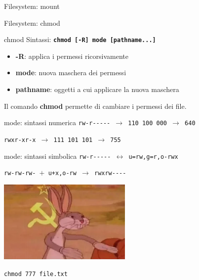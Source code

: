 \documentclass{beamer}
\begin{document}
    \begin{frame}{Filesystem: mount}
    \end{frame}

    \begin{frame}{Filesystem: chmod}
        \begin{block}{chmod}
            \small
            Sintassi: \texttt{\textbf{chmod [-R] mode [pathname...]}}

            \begin{itemize}
                \item \textbf{-R}: applica i permessi ricorsivamente
                \item \textbf{mode}: nuova maschera dei permessi
                \item \textbf{pathname}: oggetti a cui applicare la nuova maschera
            \end{itemize}

            Il comando \textbf{chmod} permette di cambiare i permessi dei file.
        \end{block}

        \begin{alertblock}{mode: sintassi numerica}
            \small
            \texttt{rw-r-{}-{}-{}-{}- $\rightarrow$ 110 100 000 $\rightarrow$ 640}

            \texttt{rwxr-xr-x $\rightarrow$ 111 101 101 $\rightarrow$ 755}
        \end{alertblock}

        \begin{alertblock}{mode: sintassi simbolica}
            \small
            \texttt{rw-r-{}-{}-{}-{}- $\leftrightarrow$ u=rw,g=r,o-rwx}
        
            \texttt{rw-rw-rw- $+$ u+x,o-rw $\rightarrow$ rwxrw-{}-{}-{}-}
        \end{alertblock}
    \end{frame}

    \begin{frame}{}
        \centering
        \includegraphics[height=4cm, keepaspectratio]{images/bugs-bunny-communist.png}
        
        \vspace{0.5cm}
        
        \Large \texttt{chmod 777 file.txt}
    \end{frame}
\end{document}
